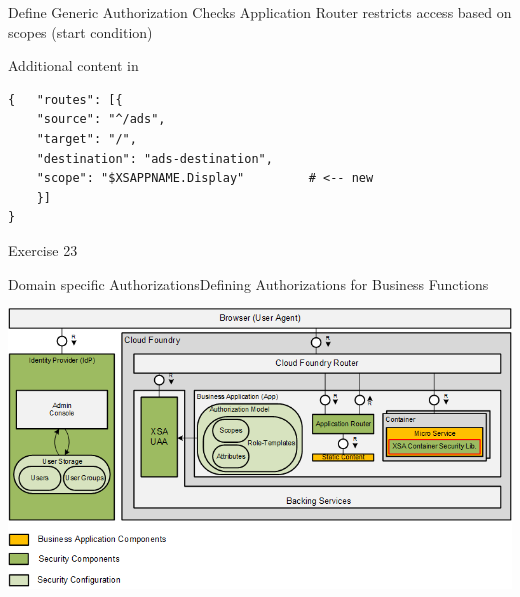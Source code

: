 \begin{frame}[fragile]{Define Generic Authorization Checks}
	Application Router restricts access based on scopes (start condition)
	\vspace{-2mm}
    \begin{block}{Additional content in }
		\vspace{-3mm}
		\scriptsize
	\begin{lstlisting}[style=json]
{	"routes": [{
    "source": "^/ads",
    "target": "/",
    "destination": "ads-destination",
    "scope": "$XSAPPNAME.Display"         # <-- new
    }]
}
		\end{lstlisting}
		\vspace{-5mm}
	\end{block}
\end{frame}


\begin{frame}{Exercise 23}
\end{frame}


\begin{frame}{Domain specific Authorizations}{Defining Authorizations for Business Functions}
\centerline{\includegraphics[width=1\textwidth]{../Security/images/XSA-Overview-All}}
\end{frame}

